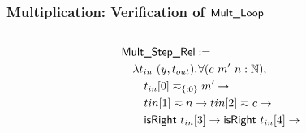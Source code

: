 \documentclass{beamer} %
\renewcommand{\Nat}{\mathbb{N}}
\begin{document}
\begin{frame}
  \frametitle{Multiplication: Verification of $\textsf{Mult\_Loop}$}
  \footnotesize

  \begin{columns}
    \tiny
    \begin{column}{0.5\textwidth}
      \begin{align*}
        & \MS{Mult\_Step\_Rel} := \\
        &\quad \lam{t_{in}~(y, t_{out})} \forall (c~m'~n:\Nat), \\
        &\quad\quad t_{in}[0] \eqsim_{\{;0\}} m' \rightarrow \\
        &\quad\quad t{in}[1] \eqsim n \rightarrow t{in}[2] \eqsim c \rightarrow \\
        &\quad\quad \MS{isRight}~t_{in}[3] \rightarrow \MS{isRight}~t_{in}[4] \rightarrow \\

\end{align*}
\end{column}
\end{columns}
\end{frame}
\end{document}
